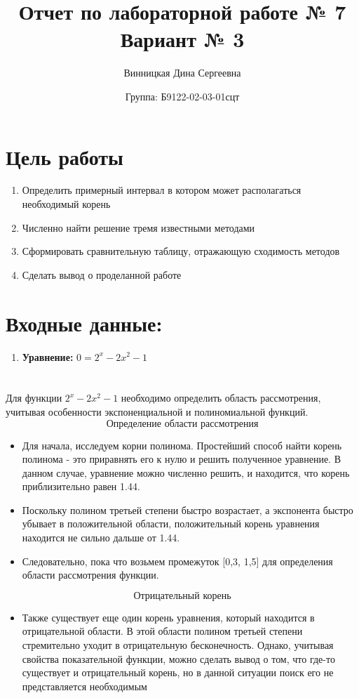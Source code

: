 \documentclass{article}
\title{Отчет по лабораторной работе № 7\\ Вариант № 3}
\author{Винницкая Дина Сергеевна}
\date{Группа: Б9122-02-03-01сцт}
\begin{document}
\maketitle
\section*{Цель работы}
\begin{enumerate}
    \item Определить примерный интервал в котором может располагаться необходимый корень
    \item Численно найти решение тремя известными методами
    \item Сформировать сравнительную таблицу, отражающую сходимость методов 
    \item Сделать вывод о проделанной работе 

    
\end{enumerate}

\section*{Входные данные:}
\begin{enumerate}

    \item \textbf{Уравнение:} $ 0 = 2^x - 2x^2 - 1$


\end{enumerate}

\section*{}
Для функции $2^x - 2x^2 - 1$ необходимо определить область рассмотрения, учитывая особенности экспоненциальной и полиномиальной функций.
$$\textbf{Определение области рассмотрения}$$
\begin{itemize}
    \item Для начала, исследуем корни полинома. Простейший способ найти корень полинома - это приравнять его к нулю и решить полученное уравнение. В данном случае, уравнение можно численно решить, и находится, что корень приблизительно равен 1.44.
    \item Поскольку полином третьей степени быстро возрастает, а экспонента быстро убывает в положительной области, положительный корень уравнения находится не сильно дальше от 1.44.
    \item Следовательно, пока что возьмем промежуток [0,3, 1,5] для определения области рассмотрения функции.
\end{itemize}
$$\textbf{Отрицательный корень}$$
\begin{itemize}
    \item Также существует еще один корень уравнения, который находится в отрицательной области. В этой области полином третьей степени стремительно уходит в отрицательную бесконечность. Однако, учитывая свойства показательной функции, можно сделать вывод о том, что где-то существует и отрицательный корень, но в данной ситуации поиск его не представляется необходимым
\end{itemize}
\end{document}
